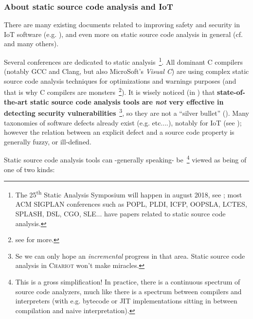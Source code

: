 \subsubsection{About static source code analysis and IoT}

There are many existing documents related to improving safety and
security in IoT software (e.g. \cite{Chen:2011:DAS, Medwed:2016:ISC}),
and even more on static source code analysis in general
(cf. \cite{Gomes2009AnOO, GosevaPopstojanova2015OnTC,
  Binkley:2007:SCA} and many others). %

Several conferences are dedicated to static analysis~\footnote{The
  25\textsuperscript{th} Static Analysis Symposium will happen in
  august 2018, see
  ; most ACM
  SIGPLAN conferences such as POPL, PLDI, ICFP, OOPSLA, LCTES, SPLASH,
  DSL, CGO, SLE... have papers related to static source code
  analysis.}.  All dominant C compilers (notably GCC and Clang, but
also MicroSoft's \emph{Visual C}\texttrademark) are using complex
static source code analysis techniques for optimizations and warnings
purposes (and that is why C compilers are monsters~\footnote{see
  for more.}). It is wisely noticed (in
\cite{GosevaPopstojanova2015OnTC}) that \textbf{state-of-the-art
  static source code analysis tools are \emph{not} very effective in
  detecting  security
  vulnerabilities}~\footnote{Se we can only hope an \emph{incremental}
  progress in that area. Static source code analysis in
  \textsc{Chariot} won't make miracles.}, so they are not a ``silver
bullet''  (\cite{Brooks:1987:NSB}). Many
taxonomies of software defects  already exist
(e.g. \cite{Silva:2016:SES, Wagner:2008:DCD, Levine:2009:DDE}
etc....), notably for IoT (see \cite{Carpent:2018:RRA,
  Ahmad:2018:ModelBasedIoT, Laszlo:2017:Vessedia}); however the
relation between an explicit defect and a source code property is
generally fuzzy, or ill-defined.

Static source code analysis tools can -generally speaking-
be~\footnote{This is a gross simplification! In practice, there is a
  continuous spectrum of source code analyzers, much like there is a
  spectrum between compilers and interpreters (with e.g. bytecode or
  JIT implementations sitting in between compilation and naive
  interpretation).} viewed as being of one of two kinds:

